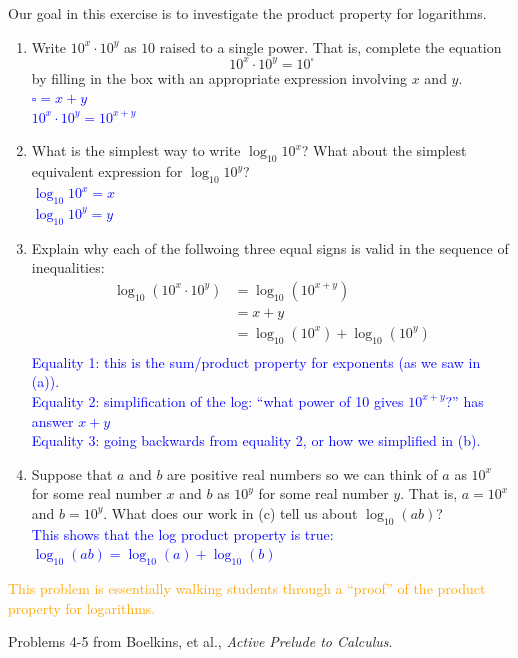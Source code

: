\documentclass{ximera}
\begin{document}
\begin{exercise}
    Our goal in this exercise is to investigate the product property for logarithms.
    \begin{enumerate}
        \item Write $10^x\cdot 10^y$ as $10$ raised to a single power.  That is, complete the equation \[10^x\cdot 10^y = 10^{\square}\]
        by filling in the box with an appropriate expression involving $x$ and $y$.\\
        \textcolor{blue}{$\square=x+y$\\
        $10^x\cdot 10^y = 10^{x+y}$}
        \item What is the simplest way to write $\log_{10}10^x$?  What about the simplest equivalent expression for $\log_{10}10^y$?\\
        \textcolor{blue}{$\log_{10}10^x=x$\\
        $\log_{10}10^y=y$}
        \item Explain why each of the follwoing three equal signs is valid in the sequence of inequalities:
        \begin{align}
            \log_{10}(10^x\cdot 10^y) & =\log_{10}(10^{x+y})\\
            &=x+y\\
            &= \log_{10}(10^x) + \log_{10}(10^y)\\
        \end{align}
        \textcolor{blue}{Equality 1: this is the sum/product property for exponents (as we saw in (a)).\\
        Equality 2: simplification of the log: ``what power of 10 gives $10^{x+y}$?'' has answer $x+y$\\
        Equality 3: going backwards from equality 2, or how we simplified in (b).}
        \item Suppose that $a$ and $b$ are positive real numbers so we can think of $a$ as $10^x$ for some real number $x$ and $b$ as $10^y$ for some real number $y$. That is, $a=10^x$ and $b=10^y$. What does our work in (c) tell us about $\log_{10}(ab)$?\\
        \textcolor{blue}{This shows that the log product property is true: $\log_{10}(ab)=\log_{10}(a)+\log_{10}(b)$ }
    \end{enumerate}
    \textcolor{orange}{This problem is essentially walking students through a ``proof'' of the product property for logarithms.}
\end{exercise}

Problems 4-5 from Boelkins, et al., \textit{Active Prelude to Calculus}.
\end{document}
